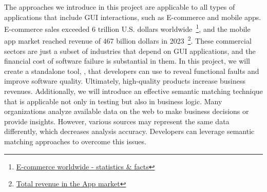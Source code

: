 \noindent
The approaches we introduce in this project are applicable to all types of applications that include GUI interactions, such as E-commerce and mobile apps.
E-commerce sales exceeded 6 trillion U.S. dollars worldwide~\footnote{\href{https://www.statista.com/topics/871/online-shopping/}{E-commerce worldwide - statistics \& facts}}, and
the mobile app market reached revenue of 467 billion dollars in 2023~\footnote{\href{https://www.statista.com/outlook/dmo/app/worldwide}{Total revenue in the App market}}.
These commercial sectors are just a subset of industries that depend on GUI applications, and the financial cost of software failure is substantial in them.
In this project, we will create a standalone tool, \rltool, that developers can use to reveal functional faults and improve software quality.
Ultimately, high-quality products increase business revenues.
%
Additionally, we will introduce an effective semantic matching technique that is applicable not only in testing but also in business logic.
Many organizations analyze available data on the web to make business decisions or provide insights. 
However, various sources may represent the same data differently, which decreases analysis accuracy. 
Developers can leverage semantic matching approaches to overcome this issues.
